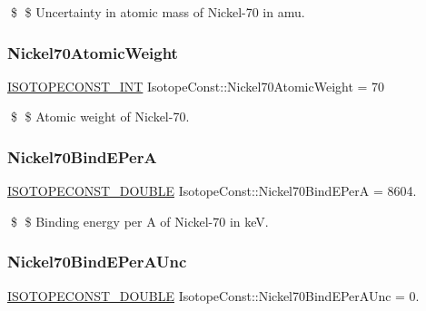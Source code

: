\$ \$ Uncertainty in atomic mass of Nickel-\/70 in amu. \mbox{\label{group___isotope_const-_nickel-_ni70_ga400085330bec6fdedd4cefe9a4bc436a}} 
\subsubsection{\texorpdfstring{Nickel70\+Atomic\+Weight}{Nickel70AtomicWeight}}
{\footnotesize\ttfamily \mbox{\hyperlink{group___isotope_const-_macros_ga5f18360b3e99483a35c32d789e62621c}{I\+S\+O\+T\+O\+P\+E\+C\+O\+N\+S\+T\+\_\+\+I\+NT}} Isotope\+Const\+::\+Nickel70\+Atomic\+Weight = 70}

\$ \$ Atomic weight of Nickel-\/70. \mbox{\label{group___isotope_const-_nickel-_ni70_ga033861b9ac9db193e016da6639161a66}} 
\subsubsection{\texorpdfstring{Nickel70\+Bind\+E\+PerA}{Nickel70BindEPerA}}
{\footnotesize\ttfamily \mbox{\hyperlink{group___isotope_const-_macros_ga8f45a7272ce02c0b4c65c44636ed719a}{I\+S\+O\+T\+O\+P\+E\+C\+O\+N\+S\+T\+\_\+\+D\+O\+U\+B\+LE}} Isotope\+Const\+::\+Nickel70\+Bind\+E\+PerA = 8604.}

\$ \$ Binding energy per A of Nickel-\/70 in keV. \mbox{\label{group___isotope_const-_nickel-_ni70_ga3f1c7c7ffbfd744dfc8565d10533cc43}} 
\subsubsection{\texorpdfstring{Nickel70\+Bind\+E\+Per\+A\+Unc}{Nickel70BindEPerAUnc}}
{\footnotesize\ttfamily \mbox{\hyperlink{group___isotope_const-_macros_ga8f45a7272ce02c0b4c65c44636ed719a}{I\+S\+O\+T\+O\+P\+E\+C\+O\+N\+S\+T\+\_\+\+D\+O\+U\+B\+LE}} Isotope\+Const\+::\+Nickel70\+Bind\+E\+Per\+A\+Unc = 0.}

